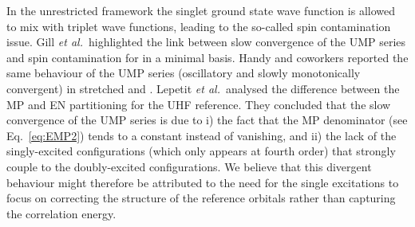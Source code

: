 \documentclass[aps,prb,reprint,noshowkeys,linenumbers,superscriptaddress]{revtex4-1}
\begin{document}
In the unrestricted framework the singlet ground state wave function is allowed to mix with triplet wave functions, leading to the so-called spin contamination issue. Gill \textit{et al.}~highlighted the link between slow convergence of the UMP series and spin contamination for  in a minimal basis. \cite{Gill_1988}
Handy and coworkers reported the same behaviour of the UMP series (oscillatory and slowly monotonically convergent) in stretched  and . \cite{Handy_1985} Lepetit \textit{et al.}~analysed the difference between the MP and EN partitioning for the UHF reference. \cite{Lepetit_1988} 
They concluded that the slow convergence of the UMP series is due to i) the fact that the MP denominator (see Eq.~\ref{eq:EMP2}) tends to a constant instead of vanishing, and ii) the lack of the singly-excited configurations (which only appears at fourth order) that strongly couple to the doubly-excited configurations.
We believe that this divergent behaviour might therefore be attributed to the need for the single excitations to focus on correcting the structure of the reference orbitals rather than capturing the correlation energy. 
\end{document}
